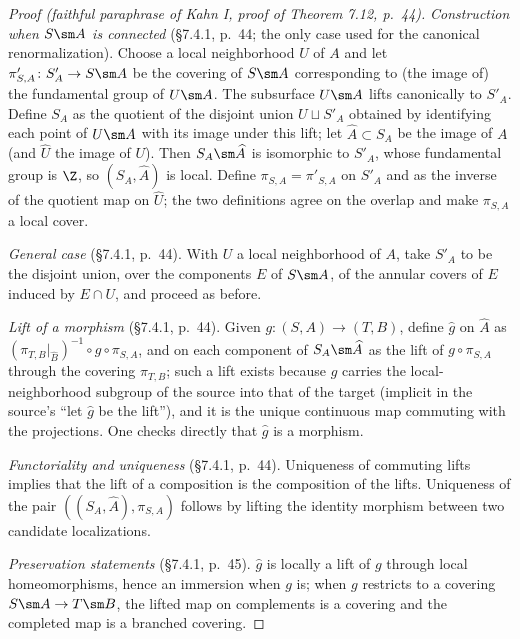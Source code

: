 \begin{proof}[Proof (faithful paraphrase of Kahn I, proof of Theorem 7.12, p.~44)]
\emph{Construction when \(S\sm A\) is connected} (\S7.4.1, p.~44; the
only case used for the canonical renormalization).  Choose a local
neighborhood \(U\) of \(A\) and let
\(\pi'_{S,A}\colon S'_A\to S\sm A\) be the covering of \(S\sm A\)
corresponding to (the image of) the fundamental group of \(U\sm A\).
The subsurface \(U\sm A\) lifts canonically to \(S'_A\).  Define
\(S_A\) as the quotient of the disjoint union \(U\sqcup S'_A\)
obtained by identifying each point of \(U\sm A\) with its image under
this lift; let \(\widehat A\subset S_A\) be the image of \(A\) (and
\(\widehat U\) the image of \(U\)).  Then \(S_A\sm\widehat A\) is
isomorphic to \(S'_A\), whose fundamental group is \(\Z\), so
\((S_A,\widehat A)\) is local.  Define \(\pi_{S,A}=\pi'_{S,A}\) on
\(S'_A\) and as the inverse of the quotient map on \(\widehat U\); the
two definitions agree on the overlap and make \(\pi_{S,A}\) a local
cover.

\emph{General case} (\S7.4.1, p.~44).  With \(U\) a local neighborhood
of \(A\), take \(S'_A\) to be the disjoint union, over the components
\(E\) of \(S\sm A\), of the annular covers of \(E\) induced by
\(E\cap U\), and proceed as before.

\emph{Lift of a morphism} (\S7.4.1, p.~44).  Given
\(g\colon(S,A)\to(T,B)\), define \(\widehat g\) on \(\widehat A\) as
\((\pi_{T,B}|_{\widehat B})^{-1}\circ g\circ\pi_{S,A}\), and on each
component of \(S_A\sm\widehat A\) as the lift of
\(g\circ\pi_{S,A}\) through the covering \(\pi_{T,B}\); such a lift
exists because \(g\) carries the local-neighborhood subgroup of the
source into that of the target (implicit in the source's ``let
\(\widehat g\) be the lift''), and it is the unique continuous map
commuting with the projections.  One checks directly that
\(\widehat g\) is a morphism.

\emph{Functoriality and uniqueness} (\S7.4.1, p.~44).  Uniqueness of commuting
lifts implies that the lift of a composition is the composition of the
lifts.  Uniqueness of the pair \(((S_A,\widehat A),\pi_{S,A})\)
follows by lifting the identity morphism between two candidate
localizations.

\emph{Preservation statements} (\S7.4.1, p.~45).  \(\widehat g\) is
locally a lift of \(g\) through local homeomorphisms, hence an
immersion when \(g\) is; when \(g\) restricts to a covering
\(S\sm A\to T\sm B\), the lifted map on complements is a covering and
the completed map is a branched covering.
\end{proof}